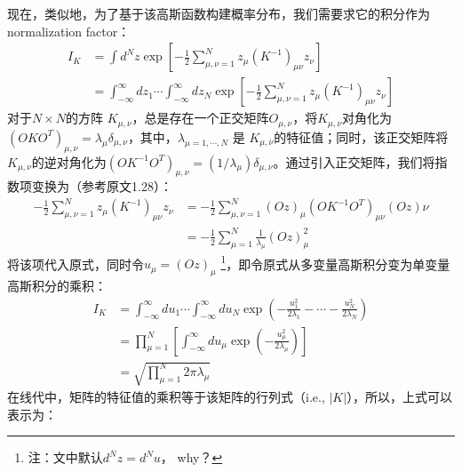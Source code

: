 现在，类似地，为了基于该高斯函数构建概率分布，我们需要求它的积分作为normalization factor：
\begin{equation}
    \begin{split}
        I_K &= \int d^N z \exp{
            \left[
                - \frac{1}{2}
                \sum_{\mu,\nu=1}^N
                {z_{\mu}(K^{-1})_{\mu\nu}z_{\nu}}
            \right]
        }\\
        &= \int_{-\infty}^{\infty} dz_1 \cdots \int_{-\infty}^{\infty} dz_N 
        \exp 
        \left[
            - \frac{1}{2} \sum_{\mu,\nu=1}^{N} 
            {z_{\mu}(K^{-1})_{\mu\nu}z_{\nu}}
        \right]
    \end{split}
\end{equation}
对于$N\times N$的方阵 $K_{\mu,\nu}$，总是存在一个正交矩阵$O_{\mu,\nu}$，将$K_{\mu,\nu}$对角化为$(OKO^T)_{\mu,\nu}=\lambda_\mu\delta_{\mu,\nu}$，其中，$\lambda_{\mu=1,\cdots,N}$ 是 $K_{\mu,\nu}$的特征值；同时，该正交矩阵将$K_{\mu,\nu}$的逆对角化为$(OK^{-1}O^T)_{\mu,\nu}=(1/\lambda_\mu)\delta_{\mu,\nu}$。通过引入正交矩阵，我们将指数项变换为（参考原文1.28）：
\begin{equation}
    \begin{split}
        - \frac{1}{2} \sum_{\mu,\nu=1}^{N} 
            {z_{\mu}(K^{-1})_{\mu\nu}z_{\nu}}
            &= - \frac{1}{2} \sum_{\mu,\nu=1}^{N} (Oz)_\mu (OK^{-1}O^T)_{\mu\nu} (Oz)\nu \\
            &= - \frac{1}{2} \sum_{\mu=1}^N \frac{1}{\lambda_\mu} (Oz)_\mu^2
    \end{split}
\end{equation}
将该项代入原式，同时令$u_\mu = (Oz)_{\mu}$ \footnote{注：文中默认$d^N z = d^N u$， why？}，即令原式从多变量高斯积分变为单变量高斯积分的乘积：
\begin{equation}
    \begin{split}
        I_K &= \int_{-\infty}^{\infty} du_1  \cdots \int_{-\infty}^{\infty} du_N 
        \exp{
            \left(
                -\frac{u_1^2}{2\lambda_1} - \cdots - \frac{u_N^2}{2\lambda_N}
            \right)
        } \\
        &= \prod_{\mu=1}^N \left[
            \int_{-\infty}^{\infty} du_\mu \exp
            \left(
                - \frac{u_\mu^2}{2\lambda_\mu}
            \right)
        \right] \\
        &= \sqrt{\prod_{\mu=1}^N 2\pi \lambda_{\mu}}
    \end{split}
\end{equation}
在线代中，矩阵的特征值的乘积等于该矩阵的行列式（i.e., $|K|$），所以，上式可以表示为：
